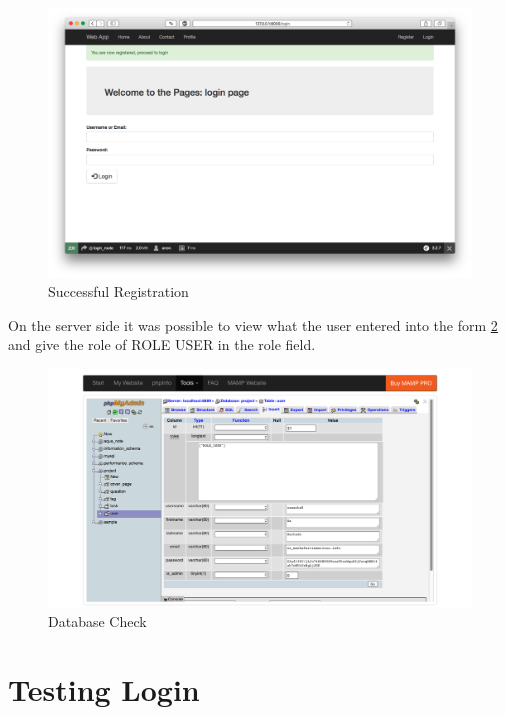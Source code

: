 \begin{figure}[t]
   \centering
   \includegraphics[width=400pt]{figures/register_successful.png} %
   \caption{Successful Registration}
   \label{fig:Successful Registration}
\end{figure}

On the server side it was possible to view what the user entered into the form \ref{fig:Database Check} and give the role of ROLE USER in the role field.

\begin{figure}[htbp]
   \centering
   \includegraphics[width=400pt]{figures/db_check.png} %
   \caption{Database Check}
   \label{fig:Database Check}
\end{figure}


\section{Testing Login}


